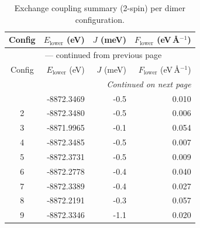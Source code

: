 
\begin{longtable}{@{}crrr@{}}
\caption{Exchange coupling summary (2-spin) per dimer configuration.}
\label{tab:exchange_couplings_2spin}\\
\toprule
Config & $E_{\mathrm{lower}}$ (eV) & $J$ (meV) & $F_{\mathrm{lower}}$ (eV\,\AA$^{-1}$)\\
\midrule
\endfirsthead
\multicolumn{4}{c}{{\tablename}~\thetable{} --- continued from previous page}\\
\toprule
Config & $E_{\mathrm{lower}}$ (eV) & $J$ (meV) & $F_{\mathrm{lower}}$ (eV\,\AA$^{-1}$)\\
\midrule
\endhead
\midrule
\multicolumn{4}{r}{\emph{Continued on next page}}\\
\endfoot
\bottomrule
\endlastfoot
1 & -8872.3469 & \textcolor{blue!55}{-0.5} & 0.010 \\
2 & -8872.3480 & \textcolor{blue!53}{-0.5} & 0.006 \\
3 & -8871.9965 & \textcolor{blue!24}{-0.1} & 0.054 \\
4 & -8872.3485 & \textcolor{blue!59}{-0.5} & 0.007 \\
5 & -8872.3731 & \textcolor{blue!56}{-0.5} & 0.009 \\
6 & -8872.2778 & \textcolor{blue!49}{-0.4} & 0.040 \\
7 & -8872.3389 & \textcolor{blue!49}{-0.4} & 0.027 \\
8 & -8872.2191 & \textcolor{blue!40}{-0.3} & 0.057 \\
9 & -8872.3346 & \textcolor{blue!100}{-1.1} & 0.020 \\
\end{longtable}